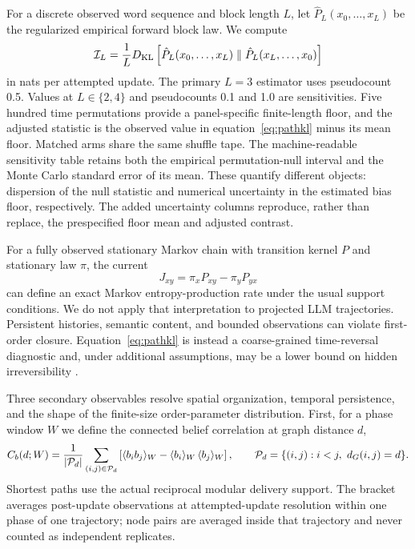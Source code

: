 \documentclass[12pt]{article}
\newcommand{\KL}{D_{\mathrm{KL}}}
\begin{document}
For a discrete observed word sequence and block length $L$, let
$\hat P_L(x_0,\ldots,x_L)$ be the regularized empirical forward block law.
We compute
\begin{equation}
{\cal I}_L=\frac{1}{L}
\KL\left[\hat P_L(x_0,\ldots,x_L)\parallel
\hat P_L(x_L,\ldots,x_0)\right]
\label{eq:pathkl}
\end{equation}
in nats per attempted update.  The primary $L=3$ estimator uses pseudocount
0.5.  Values at $L\in\{2,4\}$ and pseudocounts 0.1 and 1.0 are sensitivities.
Five hundred time permutations provide a panel-specific finite-length floor,
and the adjusted statistic is the observed value in
equation~\eqref{eq:pathkl} minus its mean floor.
Matched arms share the same shuffle tape.  The machine-readable sensitivity
table retains both the empirical permutation-null interval and the Monte Carlo
standard error of its mean.  These quantify different objects: dispersion of
the null statistic and numerical uncertainty in the estimated bias floor,
respectively.  The added uncertainty columns reproduce, rather than replace,
the prespecified floor mean and adjusted contrast.

For a fully observed stationary Markov chain with transition kernel $P$ and
stationary law $\pi$, the current
\begin{equation}
J_{xy}=\pi_xP_{xy}-\pi_yP_{yx}
\end{equation}
can define an exact Markov entropy-production rate under the usual support
conditions.  We do not apply that interpretation to projected LLM trajectories.
Persistent histories, semantic content, and bounded observations can violate
first-order closure.  Equation~\eqref{eq:pathkl} is instead a coarse-grained
time-reversal diagnostic and, under additional assumptions, may be a lower
bound on hidden irreversibility \cite{roldan2012,busiello2019,liang2023}.

Three secondary observables resolve
spatial organization, temporal persistence, and the shape of the finite-size
order-parameter distribution.  First, for a phase window $W$ we define the
connected belief correlation at graph distance $d$,
\begin{equation}
C_b(d;W)=\frac{1}{|{\cal P}_d|}\sum_{(i,j)\in{\cal P}_d}
\left[\langle b_i b_j\rangle_W-\langle b_i\rangle_W
\,\langle b_j\rangle_W\right],\qquad
{\cal P}_d=\{(i,j):i<j,\ d_G(i,j)=d\}.
\label{eq:connected-correlation}
\end{equation}
Shortest paths use the actual reciprocal modular delivery support.  The
bracket averages post-update observations at attempted-update resolution
within one phase of one
trajectory; node pairs are averaged inside that trajectory and never counted
as independent replicates.
\end{document}
